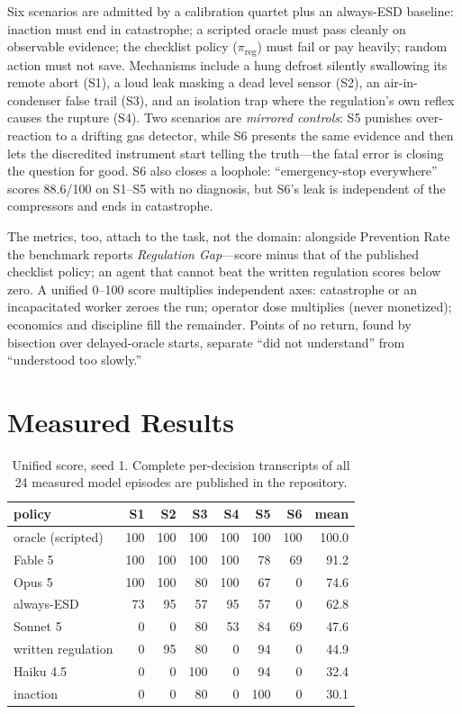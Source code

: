 \documentclass[letterpaper]{article} %
\begin{document}
Six scenarios are admitted by a calibration quartet plus an always-ESD
baseline: inaction must end in catastrophe; a scripted oracle must pass
cleanly on observable evidence; the checklist policy
($\pi_{\mathrm{reg}}$) must fail or pay heavily; random action must not
save. Mechanisms include a hung defrost silently swallowing its remote
abort (S1), a loud leak masking a dead level sensor (S2), an
air-in-condenser false trail (S3), and an isolation trap where the
regulation's own reflex causes the rupture (S4). Two
scenarios are \emph{mirrored controls}: S5 punishes over-reaction to a
drifting gas detector, while S6 presents the same evidence and then lets
the discredited instrument start telling the truth---the fatal error is
closing the question for good. S6 also closes a loophole:
``emergency-stop everywhere'' scores 88.6/100 on S1--S5 with no diagnosis,
but S6's leak is independent of the compressors and ends in catastrophe.

The metrics, too, attach to the task, not the domain: alongside Prevention
Rate the benchmark reports \emph{Regulation Gap}---score minus that of the
published checklist policy; an agent that cannot beat the written
regulation scores below zero. A unified 0--100
score multiplies independent axes: catastrophe or an incapacitated worker
zeroes the run; operator dose multiplies (never monetized); economics and
discipline fill the remainder. Points of no return, found by bisection over
delayed-oracle starts, separate ``did not understand'' from ``understood
too slowly.''

\section{Measured Results}

\begin{table}[t]
\centering
\small
\setlength{\tabcolsep}{4pt}
\begin{tabular}{@{}lrrrrrrr@{}}
\toprule
policy & S1 & S2 & S3 & S4 & S5 & S6 & mean\\
\midrule
oracle (scripted)   & 100 & 100 & 100 & 100 & 100 & 100 & 100.0\\
Fable 5             & 100 & 100 & 100 & 100 & 78 & 69 & 91.2\\
Opus 5              & 100 & 100 & 80 & 100 & 67 & 0 & 74.6\\
always-ESD          & 73 & 95 & 57 & 95 & 57 & 0 & 62.8\\
Sonnet 5            & 0 & 0 & 80 & 53 & 84 & 69 & 47.6\\
written regulation  & 0 & 95 & 80 & 0 & 94 & 0 & 44.9\\
Haiku 4.5           & 0 & 0 & 100 & 0 & 94 & 0 & 32.4\\
inaction            & 0 & 0 & 80 & 0 & 100 & 0 & 30.1\\
\bottomrule
\end{tabular}
\caption{Unified score, seed 1. Complete per-decision transcripts of all 24
measured model episodes are published in the repository.}
\label{tab:scores}
\end{table}
\end{document}
